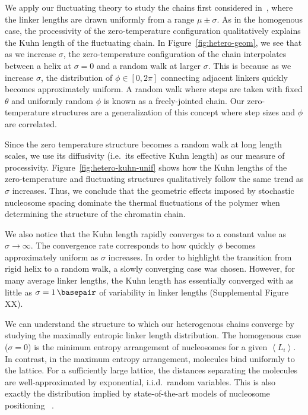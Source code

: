 \documentclass[%
 reprint,
superscriptaddress,
showpacs,preprintnumbers,
 amsmath,amssymb,
 aps,
 prl,
]{revtex4-1}
\newcommand{\meanli}{\left\langle{}L_i\right\rangle}
\begin{document}
We apply our fluctuating theory to study the chains first considered
    in~\cite{woodcock1993}, where the linker lengths are drawn uniformly from a
    range $\mu \pm \sigma$.
As in the homogenous case, the processivity of the zero-temperature
    configuration qualitatively explains the Kuhn length of the fluctuating chain.
In Figure~\ref{fig:hetero-geom}, we see that as we increase $\sigma$, the
    zero-temperature configuration of the chain interpolates between a helix at
    $\sigma = 0$ and a random walk at larger $\sigma$.
This is because as we increase $\sigma$, the distribution of $\phi \in [0, 2\pi]$ connecting
    adjacent linkers quickly becomes approximately uniform.
A random walk where steps are taken with fixed $\theta$ and uniformly
    random $\phi$ is known as a freely-jointed chain.
Our zero-temperature structures are a generalization of this concept where step
    sizes and $\phi$ are correlated.

Since the zero temperature structure becomes a random walk at long length
    scales, we use its diffusivity (i.e.\ its effective Kuhn length) as our
    measure of processivity.
Figure~\ref{fig:hetero-kuhn-unif} shows how the Kuhn lengths of the
zero-temperature and fluctuating structures qualitatively follow the same trend
as $\sigma$ increases.
Thus, we conclude that the geometric effects imposed by
    stochastic nucleosome spacing dominate the thermal fluctuations of the
    polymer when determining the structure of the chromatin chain.

We also notice that the Kuhn length rapidly converges to
a constant value as $\sigma\to\infty$.
The convergence rate corresponds to how quickly $\phi$ becomes approximately
    uniform as $\sigma$ increases.
In order to highlight the transition from rigid helix to a random walk, a slowly
    converging case was chosen.
However, for many average linker lengths, the Kuhn length has essentially
    converged with as little as $\sigma = \SI{1}{\basepair}$ of variability in
    linker lengths (Supplemental Figure XX).

We can understand the structure to which our heterogenous chains converge by studying the
maximally entropic linker length distribution. The homogenous case ($\sigma=0$) is the
    minimum entropy arrangement of nucleosomes for a given $\meanli$. In
    contrast, in the maximum entropy arrangement, molecules bind uniformly to
    the lattice. For a sufficiently large lattice, the distances separating the
    molecules are well-approximated by exponential, i.i.d.\ random variables.
This is also exactly the distribution implied by  state-of-the-art models of nucleosome
    positioning ~\cite{beshnova2014}.
\end{document}
